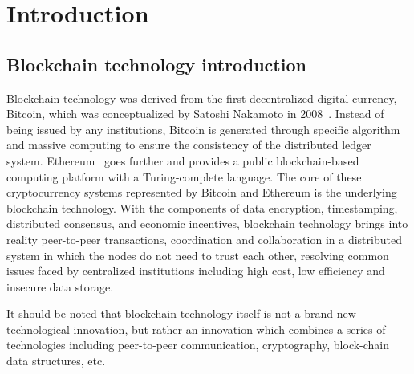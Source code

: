 \section{Introduction}

\subsection{Blockchain technology introduction}
Blockchain technology was derived from the first decentralized digital currency, Bitcoin, which was conceptualized by Satoshi Nakamoto in 2008~\cite{Nakamoto2008}. Instead of being issued by any institutions, Bitcoin is generated through specific algorithm and massive computing to ensure the consistency of the distributed ledger system. Ethereum~\cite{buterin2014ethereum} goes further and provides a public blockchain-based computing platform with a Turing-complete language. The core of these cryptocurrency systems represented by Bitcoin and Ethereum is the underlying blockchain technology. With the components of data encryption, timestamping, distributed consensus, and economic incentives, blockchain technology brings into reality peer-to-peer transactions, coordination and collaboration in a distributed system in which the nodes do not need to trust each other, resolving common issues faced by centralized institutions including high cost, low efficiency and insecure data storage.

It should be noted that blockchain technology itself is not a brand new technological innovation, but rather an innovation which combines a series of technologies including peer-to-peer communication, cryptography, block-chain data structures, etc.

